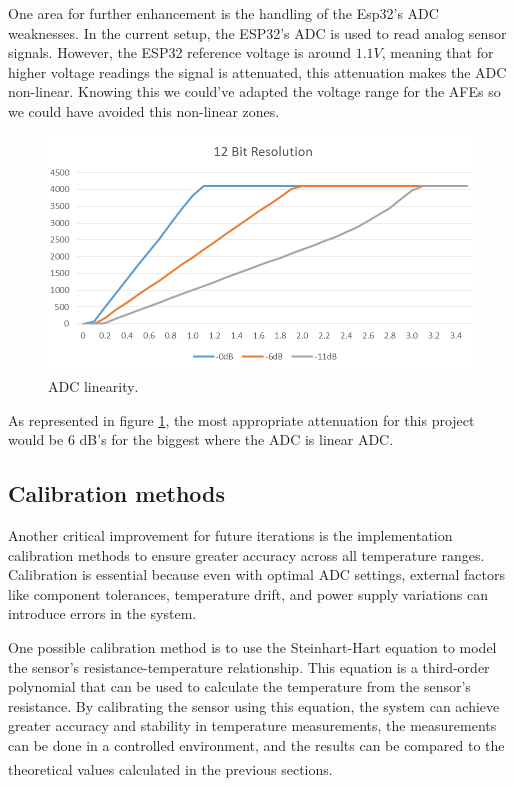 \documentclass[12pt]{article}
\begin{document}
One area for further enhancement is the handling of the Esp32's ADC weaknesses. In the current setup, the ESP32's ADC is used to read analog sensor signals. However, the ESP32 reference voltage is around $1.1V$, meaning that for higher voltage readings the signal is attenuated, this attenuation makes the ADC non-linear. 
Knowing this we could've adapted the voltage range for the AFEs so we could have avoided this non-linear zones. 

\begin{figure}[H] 
    \centering
    \includegraphics*[scale = 0.4]{images/ADC-linearity-test-at-12-bit-resolution.png}
    \caption{ADC linearity\textsuperscript{\cite{ESP32_microcontroller}}.}
    \label{fig:ADClinear}
\end{figure}

As represented in figure \ref{fig:ADClinear}, the most appropriate attenuation for this project would be 6 dB's for the biggest where the ADC is linear ADC.

\subsection{Calibration methods}

Another critical improvement for future iterations is the implementation calibration methods to ensure greater accuracy across all temperature ranges. Calibration is essential because even with optimal ADC settings, external factors like component tolerances, temperature drift, and power supply variations can introduce errors in the system.

One possible calibration method is to use the Steinhart-Hart equation to model the sensor's resistance-temperature relationship. This equation is a third-order polynomial that can be used to calculate the temperature from the sensor's resistance. By calibrating the sensor using this equation, the system can achieve greater accuracy and stability in temperature measurements, the measurements can be done in a controlled environment, and the results can be compared to the theoretical values calculated in the previous sections\textsuperscript{\cite{steinhart-hart}}.
\end{document}
